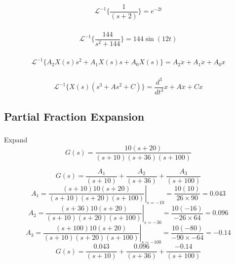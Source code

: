 \documentclass{article}	%
\newcommand{\sL}{\mathcal{L}}
\begin{document}
 \subsubsection{}

%
%
 \[
 \sL^{-1} \{ \frac {1}  {(s+2)}  \} = e^{-2t}
 \]


 \subsubsection{}

%
%
\[
 \sL^{-1} \{ \frac{144}{s^2 + 144}  \} = 144 \sin(12t)
\]

\subsubsection{}

%
%
\[
 \sL^{-1} \{ A_2X(s)s^2 + A_1X(s)s + A_0 X(s)  \}  =   A_2\ddot{x} + A_1\dot{x} + A_0x
\]

\subsubsection{}

%
%
\[
\sL^{-1} \{ X(s) (s^3 + As^2+C) \} =  \frac {d^3}{dt^3} x + A\ddot{x} + Cx
\]


\subsection{Partial Fraction Expansion}
 \subsubsection{}
 Expand
 \[
 G(s)  =  \frac         {10(s+20)}                      {(s+10)(s+36)(s+100)}
 \]

\begin{solution}
\[
G(s) = \frac{A_1}{(s+10)} + \frac{A_2}{(s+36)} + \frac{A_3}{(s+100)}
\]
\[
A_1 = \left . \frac {(s+10)10(s+20)}{(s+10)(s+20)(s+100)} \right |_{s=-10} = \frac {10(10)}{26 \times 90} = 0.043
\]
\[
A_2 = \left . \frac {(s+36)10(s+20)}{(s+10)(s+20)(s+100)} \right |_{s=-36} = \frac {10(-16)}{-26 \times 64} = 0.096
\]
\[
A_3 = \left . \frac {(s+100)10(s+20)}{(s+10)(s+20)(s+100)} \right |_{s=-100} = \frac {10(-80)}{-90 \times -64} = -0.14
\]
\vspace{0.15in}
\[
G(s) = \frac{0.043}{(s+10)} + \frac{0.096}{(s+36)} + \frac{-0.14}{(s+100)}
\]


\end{solution}
\end{document}
